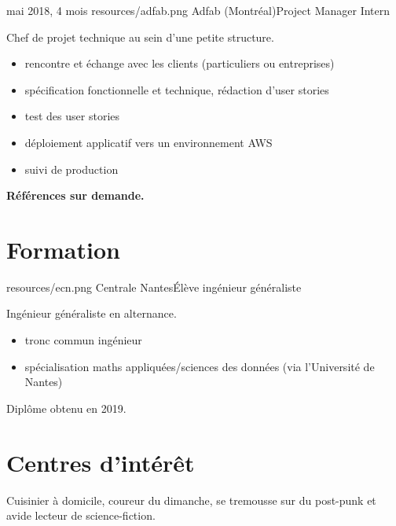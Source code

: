\documentclass{cv}
\begin{document}
\experience
{{mai 2018,  4 mois}}
{resources/adfab.png}
{Adfab (Montréal)}{Project Manager Intern}{

Chef de projet technique au sein d'une petite structure.

\begin{itemize}
	\item rencontre et échange avec les clients (particuliers ou entreprises)
	\item spécification fonctionnelle et technique, rédaction d'user stories
	\item test des user stories
	\item déploiement applicatif vers un environnement AWS
	\item suivi de production
\end{itemize}
}

\begin{center}
	\bfseries Références sur demande.
\end{center}

\pagestyle{withheader}

\section{Formation}

{resources/ecn.png}
{Centrale Nantes}{Élève ingénieur généraliste}{

Ingénieur généraliste en alternance.

\begin{itemize}
	\item tronc commun ingénieur
	\item spécialisation maths appliquées/sciences des données (via l'Université de Nantes)
\end{itemize}

Diplôme obtenu en 2019.
}

\section{Centres d'intérêt}

Cuisinier à domicile, coureur du dimanche, se tremousse sur du post-punk et avide lecteur de science-fiction.
\end{document}
